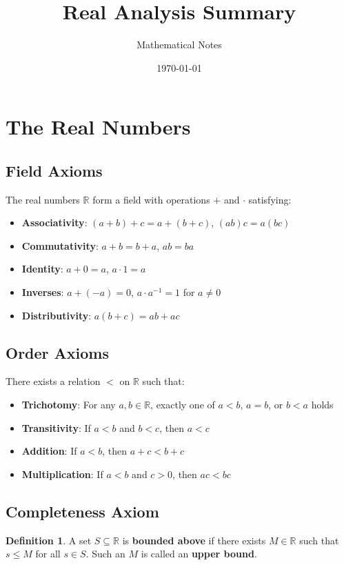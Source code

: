 \documentclass[11pt]{article}
\title{Real Analysis Summary}
\author{Mathematical Notes}
\date{\today}
\theoremstyle{definition}
\newtheorem{definition}{Definition}[section]
\begin{document}
\maketitle

\tableofcontents
\newpage

\section{The Real Numbers}

\subsection{Field Axioms}
The real numbers $\mathbb{R}$ form a field with operations $+$ and $\cdot$ satisfying:
\begin{itemize}
    \item \textbf{Associativity}: $(a+b)+c = a+(b+c)$, $(ab)c = a(bc)$
    \item \textbf{Commutativity}: $a+b = b+a$, $ab = ba$
    \item \textbf{Identity}: $a+0 = a$, $a \cdot 1 = a$
    \item \textbf{Inverses}: $a+(-a) = 0$, $a \cdot a^{-1} = 1$ for $a \neq 0$
    \item \textbf{Distributivity}: $a(b+c) = ab + ac$
\end{itemize}

\subsection{Order Axioms}
There exists a relation $<$ on $\mathbb{R}$ such that:
\begin{itemize}
    \item \textbf{Trichotomy}: For any $a,b \in \mathbb{R}$, exactly one of $a < b$, $a = b$, or $b < a$ holds
    \item \textbf{Transitivity}: If $a < b$ and $b < c$, then $a < c$
    \item \textbf{Addition}: If $a < b$, then $a + c < b + c$
    \item \textbf{Multiplication}: If $a < b$ and $c > 0$, then $ac < bc$
\end{itemize}

\subsection{Completeness Axiom}
\begin{definition}
A set $S \subseteq \mathbb{R}$ is \textbf{bounded above} if there exists $M \in \mathbb{R}$ such that $s \leq M$ for all $s \in S$. Such an $M$ is called an \textbf{upper bound}.
\end{definition}
\end{document}
